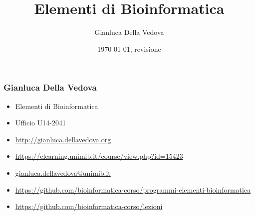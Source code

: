 \usepackage[italian]{babel}
\usepackage[utf8]{inputenc}
\usepackage{pgf}
\usepackage{verbatim}
\usepackage{inconsolata}
\usepackage{listings}


\usepackage{url}
\usepackage{xmpmulti}
\usepackage[T1]{fontenc}
\immediate{}


\author{Gianluca Della Vedova}
\title{Elementi di Bioinformatica}
\date{\today, {\tiny revisione \VCRevision}}



\beamerdefaultoverlayspecification{<+->}

\graphicspath{{figures/}}



\begin{frame}
  \titlepage
\end{frame}


\begin{frame}\frametitle{Gianluca Della Vedova}
\begin{itemize}
\item
Elementi di Bioinformatica
\item
Ufficio U14-2041
\item
\url{http://gianluca.dellavedova.org}
\item
\url{https://elearning.unimib.it/course/view.php?id=15423}
\item
\url{gianluca.dellavedova@unimib.it}
\item\url{https://github.com/bioinformatica-corso/programmi-elementi-bioinformatica}
\item\url{https://github.com/bioinformatica-corso/lezioni}
\end{itemize}
\end{frame}

